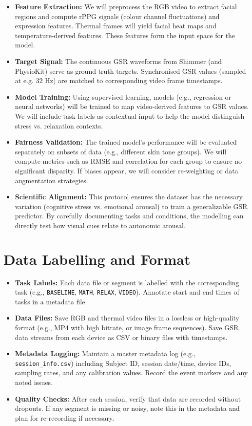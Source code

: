 \documentclass{article}
\begin{document}
\begin{itemize}
    \item \textbf{Feature Extraction:} We will preprocess the RGB video to extract facial regions and compute rPPG signals (colour channel fluctuations) and expression features. Thermal frames will yield facial heat maps and temperature-derived features. These features form the input space for the model.
    \item \textbf{Target Signal:} The continuous GSR waveforms from Shimmer (and PhysioKit) serve as ground truth targets. Synchronised GSR values (sampled at e.g. 32 Hz) are matched to corresponding video frame timestamps.
    \item \textbf{Model Training:} Using supervised learning, models (e.g., regression or neural networks) will be trained to map video-derived features to GSR values. We will include task labels as contextual input to help the model distinguish stress vs. relaxation contexts.
    \item \textbf{Fairness Validation:} The trained model's performance will be evaluated separately on subsets of data (e.g., different skin tone groups). We will compute metrics such as RMSE and correlation for each group to ensure no significant disparity. If biases appear, we will consider re-weighting or data augmentation strategies.
    \item \textbf{Scientific Alignment:} This protocol ensures the dataset has the necessary variation (cognitive stress vs. emotional arousal) to train a generalizable GSR predictor. By carefully documenting tasks and conditions, the modelling can directly test how visual cues relate to autonomic arousal.
\end{itemize}

\section{Data Labelling and Format}

\begin{itemize}
    \item \textbf{Task Labels:} Each data file or segment is labelled with the corresponding task (e.g., \texttt{BASELINE}, \texttt{MATH}, \texttt{RELAX}, \texttt{VIDEO}). Annotate start and end times of tasks in a metadata file.
    \item \textbf{Data Files:} Save RGB and thermal video files in a lossless or high-quality format (e.g., MP4 with high bitrate, or image frame sequences). Save GSR data streams from each device as CSV or binary files with timestamps.
    \item \textbf{Metadata Logging:} Maintain a master metadata log (e.g., \texttt{session\_info.csv}) including Subject ID, session date/time, device IDs, sampling rates, and any calibration values. Record the event markers and any noted issues.
    \item \textbf{Quality Checks:} After each session, verify that data are recorded without dropouts. If any segment is missing or noisy, note this in the metadata and plan for re-recording if necessary.
\end{itemize}
\end{document}

